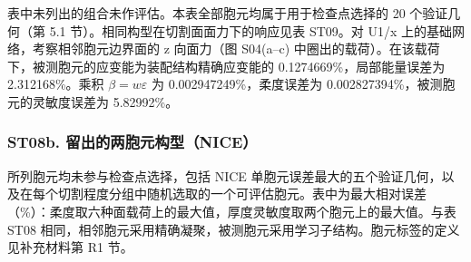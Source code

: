 \documentclass[preprint,12pt,authoryear]{elsarticle}
\begin{document}
表中未列出的组合未作评估。本表全部胞元均属于用于检查点选择的 20 个验证几何（第 5.1 节）。相同构型在切割面面力下的响应见表 ST09。对 U1/x 上的基础网络，考察相邻胞元边界面的 z 向面力（图 S04(a--c) 中圈出的载荷）。在该载荷下，被测胞元的应变能为装配结构精确应变能的 0.1274669\%，局部能量误差为 2.312168\%。乘积 \(\beta=w\varepsilon\) 为 0.002947249\%，柔度误差为 0.002827394\%，被测胞元的灵敏度误差为 5.82992\%。

\subsubsection{ST08b. 留出的两胞元构型（NICE）}

所列胞元均未参与检查点选择，包括 NICE 单胞元误差最大的五个验证几何，以及在每个切割程度分组中随机选取的一个可评估胞元。表中为最大相对误差（\%）：柔度取六种面载荷上的最大值，厚度灵敏度取两个胞元上的最大值。与表 ST08 相同，相邻胞元采用精确凝聚，被测胞元采用学习子结构。胞元标签的定义见补充材料第 R1 节。
\end{document}
